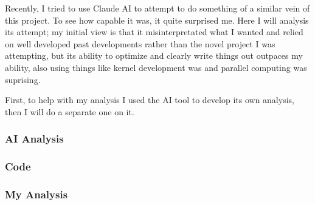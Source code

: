 Recently, I tried to use Claude AI to attempt to do something of a similar vein of this project. To see how capable it was, it quite surprised me. Here I will
analysis its attempt; my initial view is that it misinterpretated what I wanted and relied on well developed past developments rather than the novel
project I was attempting, but its ability to optimize and clearly write things out outpaces my ability, also using things like kernel development was
and parallel computing was suprising.

First, to help with my analysis I used the AI tool to develop its own analysis, then I will do a separate one on it.

\subsubsection{AI Analysis}


\subsubsection{Code}


\subsubsection{My Analysis}
